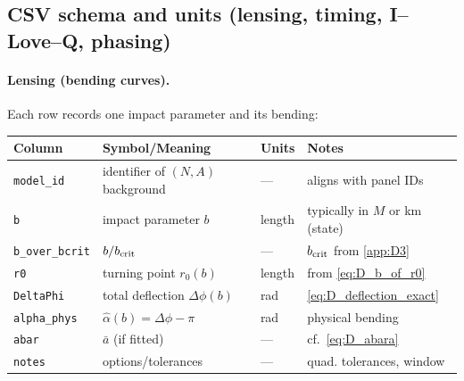 \documentclass{iopjournal}
\begin{document}
\subsection{CSV schema and units (lensing, timing, I--Love--Q, phasing)}\label{app:L1}

\paragraph{Lensing (bending curves).}
Each row records one impact parameter and its bending:
\begin{center}
\begin{tabular}{llll}
\hline
Column & Symbol/Meaning & Units & Notes \\
\hline
\texttt{model\_id} & identifier of $(N,A)$ background & --- & aligns with panel IDs \\
\texttt{b} & impact parameter $b$ & length & typically in $M$ or km (state) \\
\texttt{b\_over\_bcrit} & $b/b_{\rm crit}$ & --- & $b_{\rm crit}$ from \cref{app:D3} \\
\texttt{r0} & turning point $r_0(b)$ & length & from \eqref{eq:D_b_of_r0} \\
\texttt{DeltaPhi} & total deflection $\Delta\phi(b)$ & rad & \eqref{eq:D_deflection_exact} \\
\texttt{alpha\_phys} & $\hat\alpha(b)=\Delta\phi-\pi$ & rad & physical bending \\
\texttt{abar} & $\bar a$ (if fitted) & --- & cf.\ \eqref{eq:D_abara} \\
\texttt{notes} & options/tolerances & --- & quad. tolerances, window \\
\hline
\end{tabular}
\end{center}
\end{document}
